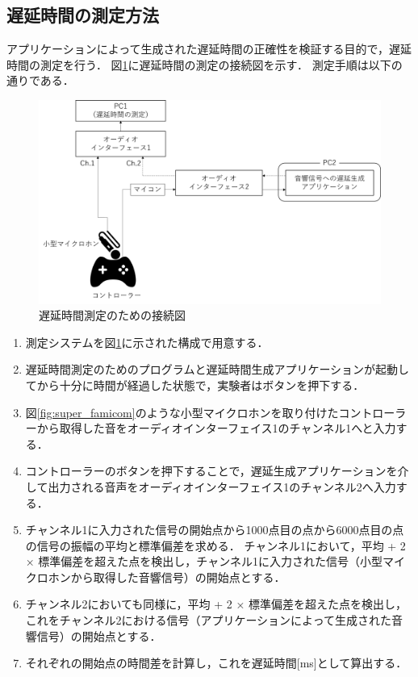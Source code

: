 \subsection{遅延時間の測定方法}
アプリケーションによって生成された遅延時間の正確性を検証する目的で，遅延時間の測定を行う．
図\ref{fig:delay_check}に遅延時間の測定の接続図を示す．
測定手順は以下の通りである．
\begin{figure}[tb]
  \centering
  \includegraphics[scale=0.45]{figures/DelayCheck/DelayCheck_EX.png}
  \caption{遅延時間測定のための接続図}
  \label{fig:delay_check}
\end{figure}
\begin{enumerate}[leftmargin=*]
  \item 測定システムを図\ref{fig:delay_check}に示された構成で用意する．
  \item 遅延時間測定のためのプログラムと遅延時間生成アプリケーションが起動してから十分に時間が経過した状態で，実験者はボタンを押下する．
  \item 図\ref{fig:super_famicom}のような小型マイクロホンを取り付けたコントローラーから取得した音をオーディオインターフェイス1のチャンネル1へと入力する．
  \item コントローラーのボタンを押下することで，遅延生成アプリケーションを介して出力される音声をオーディオインターフェイス1のチャンネル2へ入力する．
  \item チャンネル1に入力された信号の開始点から1000点目の点から6000点目の点の信号の振幅の平均と標準偏差を求める．
  チャンネル1において，平均 + 2 × 標準偏差を超えた点を検出し，チャンネル1に入力された信号（小型マイクロホンから取得した音響信号）の開始点とする．
  \item チャンネル2においても同様に，平均 + 2 × 標準偏差を超えた点を検出し，
  これをチャンネル2における信号（アプリケーションによって生成された音響信号）の開始点とする．
  \item それぞれの開始点の時間差を計算し，これを遅延時間[ms]として算出する．
\end{enumerate}
